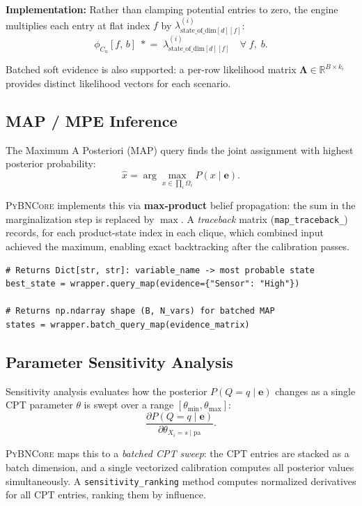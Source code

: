 \documentclass[11pt, letterpaper]{article}
\newcommand{\bncore}{\textsc{PyBNCore}}
\newcommand{\R}{\mathbb{R}}
\newcommand{\pa}{\mathrm{pa}}
\theoremstyle{definitionstyle}
\begin{document}
\noindent\textbf{Implementation:} Rather than clamping potential entries to
zero, the engine multiplies each entry at flat index $f$ by
$\lambda^{(i)}_{\text{state\_of\_dim}[d][f]}$:
\[
  \phi_{C_u}[f,\,b] \;\mathrel{*}=\; \lambda^{(i)}_{\text{state\_of\_dim}[d][f]}
  \quad \forall\; f,\; b.
\]

Batched soft evidence is also supported: a per-row likelihood matrix
$\boldsymbol{\Lambda} \in \R^{B\times k_i}$ provides distinct likelihood
vectors for each scenario.

\subsection{MAP / MPE Inference}

The Maximum A Posteriori (MAP) query finds the joint assignment with
highest posterior probability:
\[
  \hat{x} = \arg\max_{x \in \prod_i \Omega_i} P(x \mid \mathbf{e}).
\]

\bncore{} implements this via \textbf{max-product} belief propagation:
the sum in the marginalization step is replaced by $\max$. A
\emph{traceback} matrix (\texttt{map\_traceback\_}) records, for each
product-state index in each clique, which combined input achieved the
maximum, enabling exact backtracking after the calibration passes.

\begin{lstlisting}[style=pythonstyle, caption={MAP/MPE inference Python API}]
# Returns Dict[str, str]: variable_name -> most probable state
best_state = wrapper.query_map(evidence={"Sensor": "High"})

# Returns np.ndarray shape (B, N_vars) for batched MAP
states = wrapper.batch_query_map(evidence_matrix)
\end{lstlisting}

\subsection{Parameter Sensitivity Analysis}

Sensitivity analysis evaluates how the posterior $P(Q=q \mid \mathbf{e})$
changes as a single CPT parameter $\theta$ is swept over a range
$[\theta_{\min}, \theta_{\max}]$:
\[
  \frac{\partial P(Q=q\mid\mathbf{e})}{\partial \theta_{X_i=s\mid\pa}}.
\]

\bncore{} maps this to a \emph{batched CPT sweep}: the CPT entries are
stacked as a batch dimension, and a single vectorized calibration
computes all posterior values simultaneously. A \texttt{sensitivity\_ranking}
method computes normalized derivatives for all CPT entries, ranking
them by influence.
\end{document}
